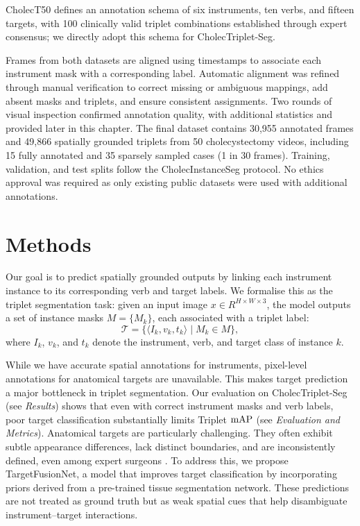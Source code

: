 CholecT50 defines an annotation schema of six instruments, ten verbs, and fifteen targets, with 100 clinically valid triplet combinations established through expert consensus; we directly adopt this schema for CholecTriplet-Seg.


Frames from both datasets are aligned using timestamps to associate each instrument mask with a corresponding \ivttriplet label. 
Automatic alignment was refined through manual verification to correct missing or ambiguous mappings, add absent masks and triplets, and ensure consistent assignments. 
Two rounds of visual inspection confirmed annotation quality, with additional statistics and  provided later in this chapter.
The final dataset contains 30{,}955 annotated frames and 49{,}866 spatially grounded triplets from 50 cholecystectomy videos, including 15 fully annotated and 35 sparsely sampled cases (1 in 30 frames).
 Training, validation, and test splits follow the CholecInstanceSeg protocol. 
No ethics approval was required as only existing public datasets were used with additional annotations. 


\section{Methods}
Our goal is to predict spatially grounded \ivttriplet outputs by linking each instrument instance to its corresponding verb and target labels. We formalise this as the triplet segmentation task: given an input image $x \in R^{H \times W \times 3}$, the model outputs a set of instance masks $M = \{ M_k \}$, each associated with a triplet label:
\[
    \mathcal{T} = \{ \langle I_k, v_k, t_k \rangle \mid M_k \in M \},
\]
where $I_k$, $v_k$, and $t_k$ denote the instrument, verb, and target class of instance $k$.

While we have accurate spatial annotations for instruments, pixel-level annotations for anatomical targets are unavailable. This makes target prediction a major bottleneck in triplet segmentation. Our evaluation on CholecTriplet-Seg (see \emph{Results}) shows that even with correct instrument masks and verb labels, poor target classification substantially limits Triplet $\textrm{mAP}$ (see \emph{Evaluation and Metrics}). Anatomical targets are particularly challenging.
They often exhibit subtle appearance differences, lack distinct boundaries, and are inconsistently defined, even among expert surgeons \cite{owen2022automated}.
%
To address this, we propose TargetFusionNet, a model that improves target classification by incorporating \anatprior priors derived from a pre-trained tissue segmentation network. These predictions are not treated as ground truth but as weak spatial cues that help disambiguate instrument–target interactions.


